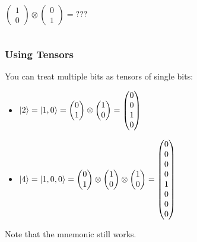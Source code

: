 \documentclass{beamer}
\begin{document}
\begin{frame}
\begin{columns}[c]
\[
\begin{pmatrix} 1 \\ 0 \end{pmatrix} \otimes \begin{pmatrix} 0 \\ 1 \end{pmatrix} = ???
\]

\end{columns}
\end{frame}

\begin{frame}
\frametitle{Using Tensors}
You can treat multiple bits as
tensors of single bits:
\begin{itemize}
    \item $\ket{2} = \ket{1,0} = \begin{pmatrix}0 \\ 1\end{pmatrix} \otimes \begin{pmatrix}1 \\ 0\end{pmatrix} =\begin{pmatrix}0 \\ 0 \\ 1 \\ 0 \end{pmatrix}$
    \item $\ket{4} = \ket{1,0,0} = \begin{pmatrix}0 \\ 1\end{pmatrix} \otimes \begin{pmatrix}1 \\ 0\end{pmatrix} \otimes \begin{pmatrix}1 \\ 0\end{pmatrix} =\begin{pmatrix}0 \\ 0 \\ 0 \\ 0 \\ 1 \\ 0 \\0 \\ 0 \end{pmatrix}$
\end{itemize}

Note that the mnemonic still works.
\end{frame}
\end{document}
